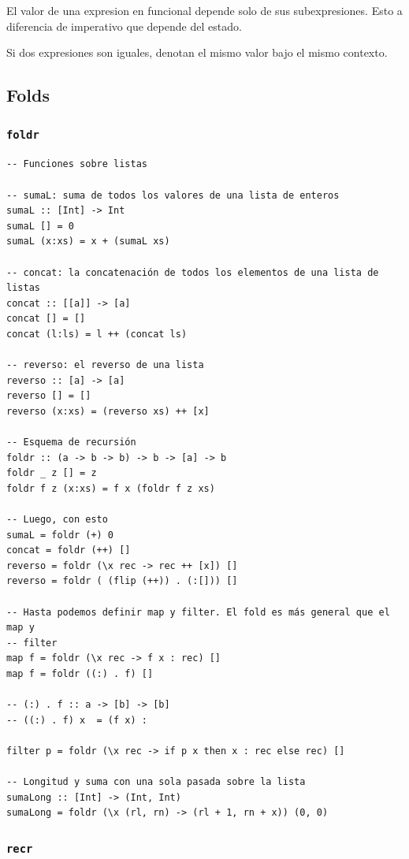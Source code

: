 \documentclass{report}
\theoremstyle{definition} %
\begin{document}
El valor de una expresion en funcional depende solo de sus subexpresiones. Esto
a diferencia de imperativo que depende del estado.

Si dos expresiones son iguales, denotan el mismo valor bajo el mismo contexto.

\subsection{Folds}

\subsubsection{\texttt{foldr}}

\begin{verbatim}
-- Funciones sobre listas

-- sumaL: suma de todos los valores de una lista de enteros
sumaL :: [Int] -> Int
sumaL [] = 0
sumaL (x:xs) = x + (sumaL xs)

-- concat: la concatenación de todos los elementos de una lista de listas
concat :: [[a]] -> [a]
concat [] = []
concat (l:ls) = l ++ (concat ls)

-- reverso: el reverso de una lista
reverso :: [a] -> [a]
reverso [] = []
reverso (x:xs) = (reverso xs) ++ [x]

-- Esquema de recursión
foldr :: (a -> b -> b) -> b -> [a] -> b
foldr _ z [] = z
foldr f z (x:xs) = f x (foldr f z xs)

-- Luego, con esto
sumaL = foldr (+) 0
concat = foldr (++) []
reverso = foldr (\x rec -> rec ++ [x]) []
reverso = foldr ( (flip (++)) . (:[])) []

-- Hasta podemos definir map y filter. El fold es más general que el map y
-- filter
map f = foldr (\x rec -> f x : rec) []
map f = foldr ((:) . f) []

-- (:) . f :: a -> [b] -> [b]
-- ((:) . f) x  = (f x) :

filter p = foldr (\x rec -> if p x then x : rec else rec) []

-- Longitud y suma con una sola pasada sobre la lista
sumaLong :: [Int] -> (Int, Int)
sumaLong = foldr (\x (rl, rn) -> (rl + 1, rn + x)) (0, 0)
\end{verbatim}

\subsubsection{\texttt{recr}}
\end{document}

